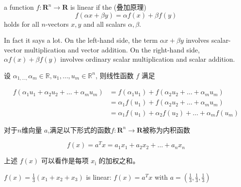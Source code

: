 \begin{theorem}
        a function $ f: \mathbf{R}^{n} \rightarrow \mathbf{R} $ is linear if the  (叠加原理)
    \begin{equation}
    f(\alpha x+\beta y)=\alpha f(x)+\beta f(y)
    \end{equation}
    holds for all $ n $-vectors $ x, y $ and all scalars $ \alpha, \beta $.
    
\end{theorem}

In fact it says a lot. On the left-hand side, the term $ \alpha x+\beta y $ involves scalar-vector multiplication and vector addition. On the right-hand side, $ \alpha f(x)+\beta f(y) $ involves ordinary scalar multiplication and scalar addition.

\begin{corollary}
    设 $ \alpha_{1, \ldots,} \alpha_{m} \in \mathbb{R}, u_{1}, \ldots, u_{m} \in \mathbb{R}^{n} $, 则线性函数 $ f $ 满足

    \begin{equation} \begin{aligned} f\left(\alpha_{1} u_{1}+\alpha_{2} u_{2}+\ldots+\alpha_{m} u_{m}\right) &=f\left(\alpha_{1} u_{1}\right)+f\left(\alpha_{2} u_{2}+\ldots+\alpha_{m} u_{m}\right) \\ &=\alpha_{1} f\left(u_{1}\right)+f\left(\alpha_{2} u_{2}+\ldots+\alpha_{m} u_{m}\right) \\ &=\alpha_{1} f\left(u_{1}\right)+\alpha_{2} f\left(u_{2}\right)+\ldots+\alpha_{m} f\left(u_{m}\right) \end{aligned} \end{equation}
\end{corollary}

\begin{definition}
    对于$n$维向量 $ a $,满足以下形式的函数$ f: \mathbf{R}^{n} \rightarrow \mathbf{R} $被称为内积函数

    \begin{equation} f(x)=a^{T} x=a_{1} x_{1}+a_{2} x_{2}+\ldots+a_{n} x_{n} \end{equation}
\end{definition}

上述 $ f(x) $ 可以看作是每项 $ x_{\mathrm{i}} $ 的加权之和。 

\begin{example}
    $ f(x)=\frac{1}{3}\left(x_{1}+x_{2}+x_{3}\right) $ is linear: $ f(x)=a^{T} x $ with $ a=\left(\frac{1}{3}, \frac{1}{3}, \frac{1}{3}\right) $
\end{example}

